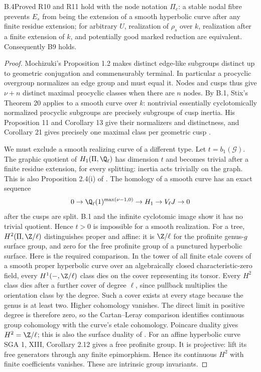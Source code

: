 \begin{claim}{B.4}{Proved}
R10 and R11 hold with the node notation $\Pi_e$: a stable nodal fibre
prevents $E_s$ from being the extension of a smooth hyperbolic curve after
any finite residue extension; for arbitrary $U$, realization of $\rho_s$
over $k$, realization after a finite extension of $k$, and potentially good
marked reduction are equivalent. Consequently B9 holds.
\end{claim}
\begin{proof}
Mochizuki's Proposition 1.2 makes distinct edge-like subgroups distinct up to
geometric conjugation and commensurably terminal. In particular a procyclic
overgroup normalizes an edge group and must equal it. Nodes and cusps thus
give $\nu+n$ distinct maximal procyclic classes when there are $n$ nodes.
By B.1, Stix's Theorem 20 applies to a smooth curve over $k$: nontrivial
essentially cyclotomically normalized procyclic subgroups are precisely
subgroups of cusp inertia. His Proposition 11 and Corollary 13 give their
normalizers and distinctness, and Corollary 21 gives precisely one maximal
class per geometric cusp \citep{CF_Stix2008}.

We must exclude a smooth realizing curve of a different type. Let
$t=b_1(\mathcal G)$. The graphic quotient of $H_1(\Pi,\Q_\ell)$ has dimension
$t$ and becomes trivial after a finite residue extension, for every splitting:
inertia acts trivially on the graph. This is also Proposition 2.4(i) of
\citet{BC_MochComb}. The homology of a smooth curve has an exact sequence
\[
 0\to\Q_\ell(1)^{\max(\nu-1,0)}\to
 H_1\to V_\ell J\to0
\]
after the cusps are split. B.1 and the infinite cyclotomic image show it has
no trivial quotient. Hence $t>0$ is impossible for a smooth realization.
For a tree, $H^2(\Pi,\Z/\ell)$ distinguishes proper and affine: it is
$\Z/\ell$ for the profinite genus-$g$ surface group, and zero for the free
profinite group of a punctured hyperbolic surface. Here is the required
comparison. In the tower of all finite etale covers of a smooth proper
hyperbolic curve over an algebraically closed characteristic-zero field,
every $H^1(-,\Z/\ell)$ class dies on the cover representing its torsor.
Every $H^2$ class dies after a further cover of degree $\ell$, since
pullback multiplies the orientation class by the degree. Such a cover
exists at every stage because the genus is at least two. Higher cohomology
vanishes. The direct limit in positive degree is therefore zero, so the
Cartan--Leray comparison identifies continuous group cohomology with the
curve's etale cohomology. Poincare duality gives $H^2=\Z/\ell$;
this is also the surface duality of \citet[Proposition 1.3]{BC_MochComb}.
For an affine hyperbolic curve SGA 1, XIII, Corollary 2.12 gives a free
profinite group. It is projective: lift its free generators through any
finite epimorphism. Hence its continuous $H^2$ with finite coefficients
vanishes. These are intrinsic group invariants.


\end{proof}
